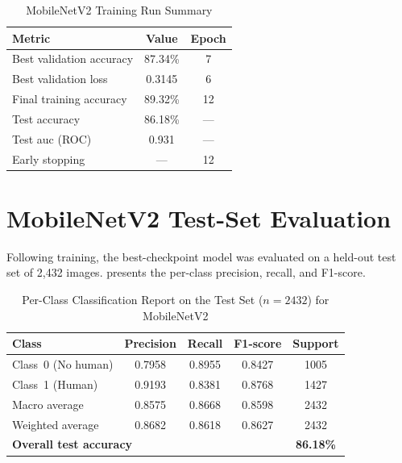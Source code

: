 \begin{table}[H]
\renewcommand{\arraystretch}{1.25}
\caption{MobileNetV2 Training Run Summary}
\label{tab:mobilenet_summary}
\centering
\begin{tabular}{lcc}
\toprule
\textbf{Metric}              & \textbf{Value}  & \textbf{Epoch} \\
\midrule
Best validation accuracy     & 87.34\%         & 7              \\
Best validation loss         & 0.3145          & 6              \\
Final training accuracy      & 89.32\%         & 12             \\
Test accuracy                & 86.18\%         & ---            \\
Test \gls{auc} (ROC)         & 0.931           & ---            \\
Early stopping               & ---             & 12             \\
\bottomrule
\end{tabular}
\end{table}

\section{MobileNetV2 Test-Set Evaluation}
Following training, the best-checkpoint model was evaluated on a held-out test set of 2,432
images.  presents the per-class precision, recall, and
F1-score.
\begin{table}[H]
\renewcommand{\arraystretch}{1.25}
\caption{Per-Class Classification Report on the Test Set ($n = 2432$) for MobileNetV2}
\label{tab:mobilenet_classification_report}
\centering
\begin{tabular}{lcccc}
\toprule
\textbf{Class}       & \textbf{Precision} & \textbf{Recall}
                      & \textbf{F1-score}  & \textbf{Support} \\
\midrule
Class~0 (No human)   & 0.7958 & 0.8955 & 0.8427 & 1005 \\
Class~1 (Human)      & 0.9193 & 0.8381 & 0.8768 & 1427 \\
\midrule
Macro average        & 0.8575 & 0.8668 & 0.8598 & 2432 \\
Weighted average     & 0.8682 & 0.8618 & 0.8627 & 2432 \\
\midrule
\multicolumn{4}{l}{\textbf{Overall test accuracy}} & \textbf{86.18\%} \\
\bottomrule
\end{tabular}
\end{table}

